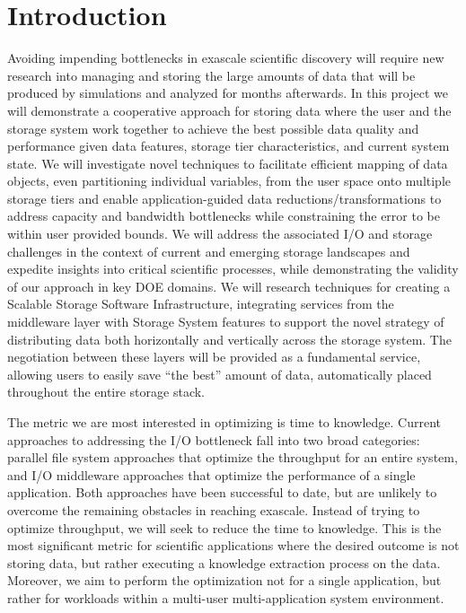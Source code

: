 \section{Introduction} 
\label{sec:introduction}

Avoiding impending bottlenecks in exascale scientific discovery will require
new research into managing and storing the large amounts of data
that will be produced by simulations and analyzed for months
afterwards.
%
In this project we will demonstrate a cooperative approach for storing data
where the user and the storage system work together to achieve the best possible data
quality and performance given data features, storage tier characteristics,
and current system state. We will investigate novel techniques to facilitate efficient
mapping of data objects, even partitioning individual variables, from the user
space onto multiple storage tiers and enable application-guided data
reductions/transformations to address capacity and bandwidth bottlenecks while
constraining the error to be within user provided bounds.
% 
We will address the associated I/O and storage challenges in the context of
current and emerging storage landscapes and expedite insights into critical
scientific processes, while demonstrating the validity of our approach in key DOE
domains. We will research techniques for creating a Scalable
Storage Software Infrastructure, integrating services from the middleware
layer with Storage System features to support the
novel strategy of distributing data both horizontally and vertically across the storage
system. 
The negotiation between these layers will be provided as a fundamental service, 
allowing users to easily save ``the best'' amount of data, automatically placed
throughout the entire storage stack.

The metric we are most interested in optimizing is time to knowledge.
Current approaches to addressing the I/O bottleneck fall into two broad
categories: parallel file system approaches that optimize the throughput for
an entire system, and I/O middleware approaches that optimize the
performance of a single application. Both approaches have been successful to date, but
are unlikely to overcome the remaining obstacles in reaching exascale. Instead
of trying to optimize throughput, we will seek to reduce the time to
knowledge. This is the most significant metric for scientific applications
where the desired outcome is not storing data, but rather executing a
knowledge extraction process on the data. Moreover, we aim to perform the
optimization not for a single application, but rather for workloads within a
multi-user multi-application system environment.

